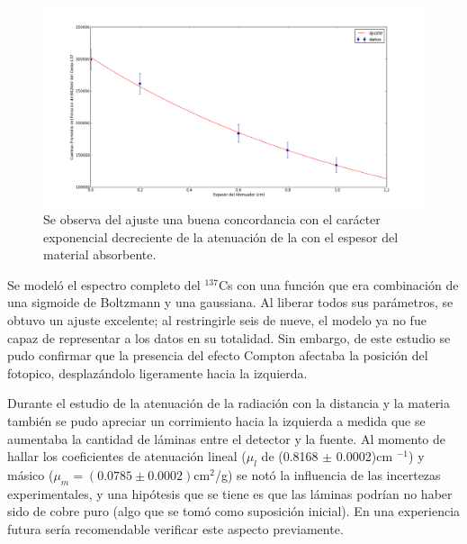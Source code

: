 \documentclass[twoside]{article}
\begin{document}
\begin{multicols}{2}
\begin{figure}[H]
    \centering
    \includegraphics[scale=0.2]{Ajuste_Curva_Coeficiente_de_Atenuacion_Lineal.png}
    \caption{Se observa del ajuste una buena concordancia con el carácter exponencial decreciente de la atenuación de la  con el espesor del material absorbente.}
    \label{ajuste_atenuacion}
\end{figure}

Se modeló el espectro completo del $^{137}$Cs con una función que era combinación de una sigmoide de Boltzmann y una gaussiana. Al liberar todos sus parámetros, se obtuvo un ajuste excelente; al restringirle seis de nueve, el modelo ya no fue capaz de representar a los datos en su totalidad. Sin embargo, de este estudio se pudo confirmar que la presencia del efecto Compton afectaba la posición del fotopico, desplazándolo ligeramente hacia la izquierda.

Durante el estudio de la atenuación de la radiación con la distancia y la materia también se pudo apreciar un corrimiento hacia la izquierda a medida que se aumentaba la cantidad de láminas entre el detector y la fuente. Al momento de hallar los coeficientes de atenuación lineal (${\mu_l}$ de (0.8168 ${\pm}$ 0.0002)cm ${^{-1}}$) y másico ($\mu_m = (0.0785 \pm 0.0002)$cm$^2$/g) se notó la influencia de las incertezas experimentales, y una hipótesis que se tiene es que las láminas podrían no haber sido de cobre puro (algo que se tomó como suposición inicial). En una experiencia futura sería recomendable verificar este aspecto previamente.

\begin{thebibliography}{90}


\end{thebibliography}
\end{multicols}
\end{document}
